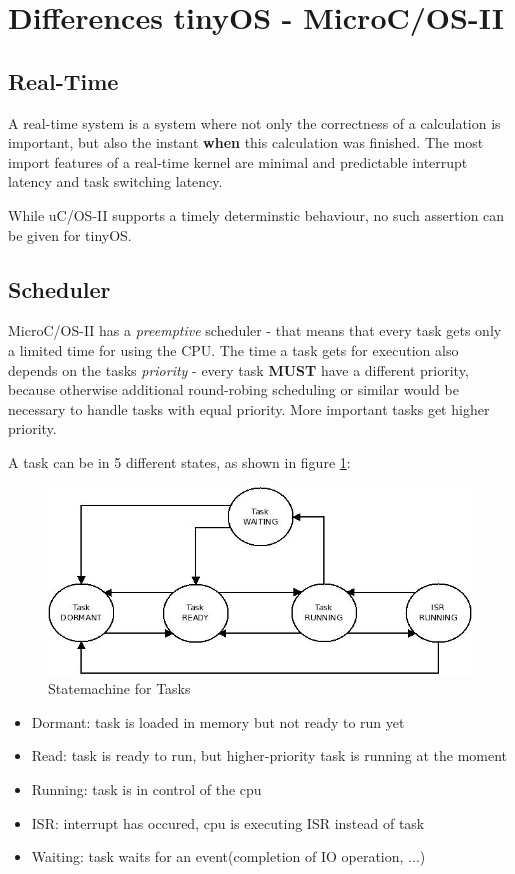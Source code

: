 \section{Differences tinyOS - MicroC/OS-II}

\subsection{Real-Time}

A real-time system is a system where not only the correctness of a calculation is important, but also the instant \textbf{when} this calculation was finished. The most import features of a real-time kernel are minimal and predictable interrupt latency and task switching latency.

While uC/OS-II supports a timely determinstic behaviour, no such assertion can be given for tinyOS.

\subsection{Scheduler}

MicroC/OS-II has a \textit{preemptive} scheduler - that means that every task gets only a limited time for using the CPU. The time a task gets for execution also depends on the tasks \textit{priority} - every task \textbf{MUST} have a different priority, because otherwise additional round-robing scheduling or similar would be necessary to handle tasks with equal priority. More important tasks get higher priority.

A task can be in 5 different states, as shown in figure \ref{fig:tasksstates}:

\begin{figure}[h]
 \centerline{\includegraphics[width=.8\columnwidth]{pics/uCtasks.png}}
  \caption{Statemachine for Tasks}
  \label{fig:tasksstates}
\end{figure}

\begin{itemize}
 \item Dormant: task is loaded in memory but not ready to run yet
 \item Read: task is ready to run, but higher-priority task is running at the moment 
 \item Running: task is in control of the cpu
 \item ISR: interrupt has occured, cpu is executing ISR instead of task
 \item Waiting: task waits for an event(completion of IO operation, ...)
\end{itemize}

